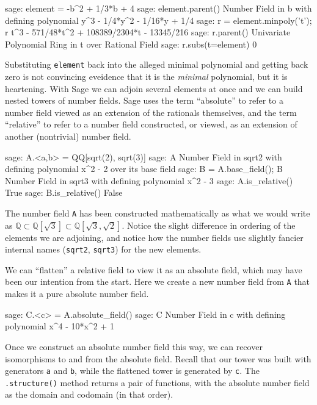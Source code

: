 %
\begin{sageexample}
sage: element = -b^2 + 1/3*b + 4
sage: element.parent()
Number Field in b with
defining polynomial y^3 - 1/4*y^2 - 1/16*y + 1/4
sage: r = element.minpoly('t'); r
t^3 - 571/48*t^2 + 108389/2304*t - 13345/216
sage: r.parent()
Univariate Polynomial Ring in t over Rational Field
sage: r.subs(t=element)
0
\end{sageexample}
%
Substituting \verb?element? back into the alleged minimal polynomial and getting back zero is not convincing eveidence that it is the \emph{minimal} polynomial, but it is heartening.
%
%
With Sage we can adjoin several elements at once and we can build nested towers of number fields.  Sage uses the term ``absolute'' to refer to a number field viewed as an extension of the rationals themselves, and the term ``relative'' to refer to a number field constructed, or viewed, as an extension of another (nontrivial) number field.
%
\begin{sageexample}
sage: A.<a,b> = QQ[sqrt(2), sqrt(3)]
sage: A
Number Field in sqrt2 with defining polynomial x^2 - 2 over
its base field
sage: B = A.base_field(); B
Number Field in sqrt3 with defining polynomial x^2 - 3
sage: A.is_relative()
True
sage: B.is_relative()
False
\end{sageexample}
%
The number field \verb?A? has been constructed mathematically as what we would write as ${\mathbb Q}\subset{\mathbb Q}[\sqrt{3}]\subset{\mathbb Q}[\sqrt{3},\sqrt{2}]$.  Notice the slight difference in ordering of the elements we are adjoining, and notice how the number fields use slightly fancier internal names (\verb?sqrt2?, \verb?sqrt3?) for the new elements.\par
%
We can ``flatten'' a relative field to view it as an absolute field, which may have been our intention from the start.  Here we create a new number field from \verb?A? that makes it a pure absolute number field.
%
\begin{sageexample}
sage: C.<c> = A.absolute_field()
sage: C
Number Field in c with defining polynomial x^4 - 10*x^2 + 1
\end{sageexample}
%
Once we construct an absolute number field this way, we can recover isomorphisms to and from the absolute field.  Recall that our tower was built with generators \verb?a? and \verb?b?, while the flattened tower is generated by \verb?c?.  The \verb?.structure()? method returns a pair of functions, with the absolute number field as the domain and codomain (in that order).
